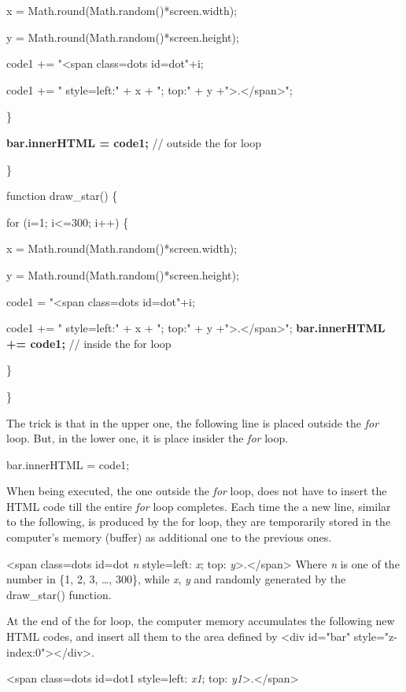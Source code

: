\documentclass[
]{article}
\begin{document}
x = Math.round(Math.random()*screen.width);

y = Math.round(Math.random()*screen.height);

code1 += "\textless span class=dots id=dot"+i;

code1 += " style=\textquotesingle left:" + x + "; top:" + y
+"\textquotesingle\textgreater.\textless/span\textgreater";

\}

\textbf{bar.innerHTML = code1;} // outside the for loop \textbf{}

\}

function draw\_star() \{

for (i=1; i\textless=300; i++) \{

x = Math.round(Math.random()*screen.width);

y = Math.round(Math.random()*screen.height);

code1 = "\textless span class=dots id=dot"+i;

code1 += " style=\textquotesingle left:" + x + "; top:" + y
+"\textquotesingle\textgreater.\textless/span\textgreater";
\textbf{bar.innerHTML += code1;} // inside the for loop \textbf{}

\}

\}

The trick is that in the upper one, the following line is placed outside
the \emph{for} loop. But, in the lower one, it is place insider the
\emph{for} loop.

bar.innerHTML = code1;

When being executed, the one outside the \emph{for} loop, does not have
to insert the HTML code till the entire \emph{for} loop completes. Each
time the a new line, similar to the following, is produced by the for
loop, they are temporarily stored in the computer's memory (buffer) as
additional one to the previous ones.

\textless span class=dots id=dot \emph{n} style=\textquotesingle left:
\emph{x}; top:
\emph{y}\textquotesingle\textgreater.\textless/span\textgreater{} Where
\emph{n} is one of the number in \{1, 2, 3, \ldots, 300\}, while
\emph{x}, \emph{y} and randomly generated by the draw\_star() function.

At the end of the for loop, the computer memory accumulates the
following new HTML codes, and insert all them to the area defined by
\textless div id="bar"
style="z-index:0"\textgreater\textless/div\textgreater.

\textless span class=dots id=dot1 style=\textquotesingle left:
\emph{x1}; top:
\emph{y1}\textquotesingle\textgreater.\textless/span\textgreater{}
\end{document}
